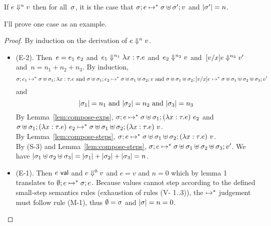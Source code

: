 \documentclass{article}
\begin{document}
\begin{thm}\label{thm:forward}
  If $\eval[n]{e}{v}$ then for all~$\store$, it is the case that
  $\cfg{\store}{e} \step^* \cfg{\stjoin{\store}{\store'}}{v}$
  and $|\store'| = n$.
\end{thm}

I'll prove one case as an example.

\begin{proof}
  By induction on the derivation of $\eval[n]{e}{v}$.
  \begin{itemize}
    
  \item (E-2).
    Then~$e = \kwapp{e_1}{e_2}$
    and~$\eval[n_1]{e_1}{\kwfun{x}{\tau}{e}}$
    and~$\eval[n_2]{e_2}{v}$
    and~$\eval[n_3]{\sub{v}{x}{e}}{v'}$ and~$n = n_1 + n_2 + n_3$.
    By induction,
    \[
    \cfg{\store}{e_1} \step^*
    \cfg{\stjoin{\store}{\store_1}}{\kwfun{x}{\tau}{e}}
    \text{~and~}\cfg{\stjoin{\store}{\store_1}}{e_2} \step^*
    \cfg{\stjoin{\stjoin{\store}{\store_1}}{\store_2}}{v}
    \text{~and~}\cfg{\stjoin{\stjoin{\store}{\store_1}}{\store_2}}
    {\sub{v}{x}{e}} \step^*
    \cfg{\stjoin{\stjoin{\stjoin{\store}{\store_1}}{\store_2}}{\store_3}}
        {v'}
    \]
    and
    \[|\store_1| = n_1\text{~and~}|\store_2| = n_2\text{~and~}|\store_3| = n_3\]
    By Lemma~\ref{lem:compose-exps},
    $\cfg{\store}{e} \step^*
    \cfg{\stjoin{\store}{\store_1}}{\kwapp{(\kwfun{x}{\tau}{e})}{e_2}}$
    and~$\cfg{\stjoin{\store}{\store_1}}{\kwapp{(\kwfun{x}{\tau}{e})}{e_2}}
    \step^*
    \cfg{\stjoin{\stjoin{\store}{\store_1}}{\store_2}}
          {\kwapp{(\kwfun{x}{\tau}{e})}{v}}$.\\
          By Lemma~\ref{lem:compose-steps},
      $\cfg{\store}{e} \step^*
        \cfg{\stjoin{\stjoin{\store}{\store_1}}{\store_2}}
            {(\kwapp{\kwfun{x}{\tau}{e})}{v}}$.\\
      By (S-3) and Lemma~\ref{lem:compose-steps},
      $\cfg{\store}{e} \step^*
      \cfg{\stjoin{\stjoin{\stjoin{\store}{\store_1}}{\store_2}}{\store_3}}
          {v'}$.
          We have
      $|\stjoin{\store_1}{\stjoin{\store_2}{\store_3}}| =
      |\store_1| + |\store_2| + |\store_3| = n$.

\item (E-1). Then $e \val$ and $\eval[0]{e}{v}$ and $e = v$ and $n = 0$ which by lemma 1 translates to $\cfg{\estore}{e} \step^* \cfg{\store}{e}$. Because values cannot step according to the defined small-step semantics rules (exhaustion of rules (V- 1..3)), the $\step^*$ judgement must follow rule (M-1), thus $\estore = \store$ and $|\store| = n = 0$.


\end{itemize}
\end{proof}
\end{document}
